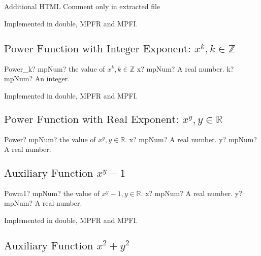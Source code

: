 \begin{extract}
	Additional HTML Comment only in extracted file
\end{extract}

Implemented in double, MPFR and MPFI.



\subsection{\texorpdfstring{$\text{Power Function with Integer Exponent: }x^k, k \in  \mathbb{Z}$}{powerxk}}

\begin{mpFunctionsExtract}
	\mpFunctionTwo
	{Power\_k? mpNum? the value of $x^k, k \in  \mathbb{Z}$}
	{x? mpNum? A real number.}
	{k? mpNum? An integer.}
\end{mpFunctionsExtract}

Implemented in double, MPFR and MPFI.



\subsection{\texorpdfstring{$\text{Power Function with Real Exponent: }x^y, y \in  \mathbb{R}$}{powerxy}}

\begin{mpFunctionsExtract}
	\mpFunctionTwo
	{Power? mpNum? the value of $x^y, y \in  \mathbb{R}$.}
	{x? mpNum? A real number.}
	{y? mpNum? A real number.}
\end{mpFunctionsExtract}



\subsection{\texorpdfstring{$\text{Auxiliary Function }x^y-1$}{Powm1}}

\begin{mpFunctionsExtract}
	\mpFunctionTwo
	{Powm1? mpNum? the value of $x^y-1, y \in  \mathbb{R}$.}
	{x? mpNum? A real number.}
	{y? mpNum? A real number.}
\end{mpFunctionsExtract}

Implemented in double, MPFR and MPFI.



\subsection{\texorpdfstring{$\text{Auxiliary Function }x^2+y^2$}{x2py2}}

